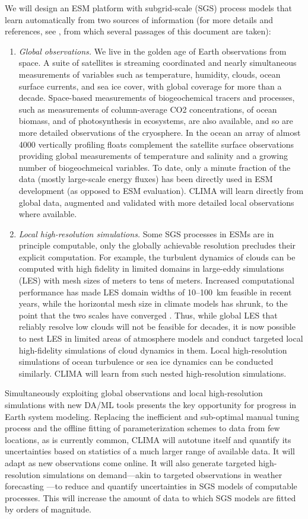 \documentclass{article}
\begin{document}
We will design an ESM platform with subgrid-scale (SGS) process models that learn automatically from two sources of information (for more details and references, see \citet{Schneider17c}, from which several passages of this document are taken):
\begin{enumerate}
    \item \emph{Global observations.} We live in the golden age of Earth observations from space. A suite of satellites is streaming coordinated and nearly simultaneous measurements of variables such as temperature, humidity, clouds, ocean surface currents, and sea ice cover, with global coverage for more than a decade. Space-based measurements of biogeochemical tracers and processes, such as measurements of column-average CO2 concentrations, of ocean biomass, and of photosynthesis in ecosystems, are also available, and so are more detailed observations of the cryosphere. In the ocean an array of almost 4000 vertically profiling floats complement the satellite surface observations providing global measurements of temperature and salinity and a growing number of biogeochmeical variables. To date, only a minute fraction of the data (mostly large-scale energy fluxes) has been directly used in ESM development (as opposed to ESM evaluation). CLIMA will learn directly from global data, augmented and validated with more detailed local observations where available.
    \item \emph{Local high-resolution simulations.} Some SGS processes in ESMs are in principle computable, only the globally achievable resolution precludes their explicit computation. For example, the turbulent dynamics of clouds can be computed with high fidelity in limited domains in large-eddy simulations (LES) with mesh sizes of meters to tens of meters. Increased computational performance has made LES domain widths of 10--100~km feasible in recent years, while the horizontal mesh size in climate models has shrunk, to the point that the two scales have converged \citep{Schneider17a}. Thus, while global LES that reliably resolve low clouds will not be feasible for decades, it is now possible to nest LES in limited areas of atmosphere models and conduct targeted local high-fidelity simulations of cloud dynamics in them. Local high-resolution simulations of ocean turbulence or sea ice dynamics can be conducted similarly. CLIMA will learn from such nested high-resolution simulations.
\end{enumerate}
Simultaneously exploiting global observations and local high-resolution simulations with new DA/ML tools presents the key opportunity for  progress in Earth system modeling. Replacing the inefficient and sub-optimal manual tuning process and the offline fitting of parameterization schemes to data from few locations, as is currently common, CLIMA will autotune itself and quantify its uncertainties based on statistics of a much larger range of available data. It will adapt as new observations come online. It will also generate targeted high-resolution simulations on demand---akin to targeted observations in weather forecasting \citep{Palmer98a,Lorenz98a}---to reduce and quantify uncertainties in SGS models of computable processes. This will increase the amount of data to which SGS models are fitted by orders of magnitude.
\end{document}
